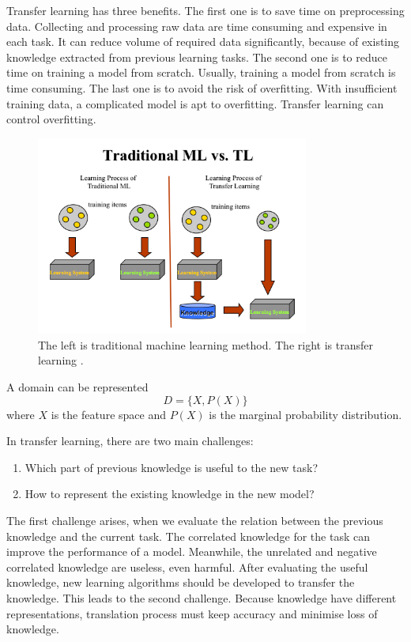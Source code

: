 Transfer learning has three benefits. The first one is to save time on preprocessing data. Collecting and processing raw data are time consuming and expensive in each task. It can reduce volume of required data significantly, because of existing knowledge extracted from previous learning tasks. The second one is to reduce time on training a model from scratch. Usually, training a model from scratch is time consuming. The last one is to avoid the risk of overfitting. With insufficient training data, a complicated model is apt to overfitting. Transfer learning can control overfitting.

\graphicspath{ {./Figures/} }
\begin{figure}[!htb]
\centering
\includegraphics[width=0.8\textwidth]{MLvsTL.png}
\caption{\label{fig:TransferLearning}The left is traditional machine learning method. The right is transfer learning \citep{TransferlearningDiagram}.}
\end{figure}

A domain can be represented
\begin{equation}\label{eq:TransLearning}
D = \{ X, P(X) \}
\end{equation}
where $X$ is the feature space and $P(X)$ is the marginal probability distribution. 

In transfer learning, there are two main challenges: 
\begin{enumerate}
  \item Which part of previous knowledge is useful to the new task?
  \item How to represent the existing knowledge in the new model?
\end{enumerate}
The first challenge arises, when we evaluate the relation between the previous knowledge and the current task. The correlated knowledge for the task can improve the performance of a model. Meanwhile, the unrelated and negative correlated knowledge are useless, even harmful. After evaluating the useful knowledge, new learning algorithms should be developed to transfer the knowledge. This leads to the second challenge. Because knowledge have different representations, translation process must keep accuracy and minimise loss of knowledge. 
